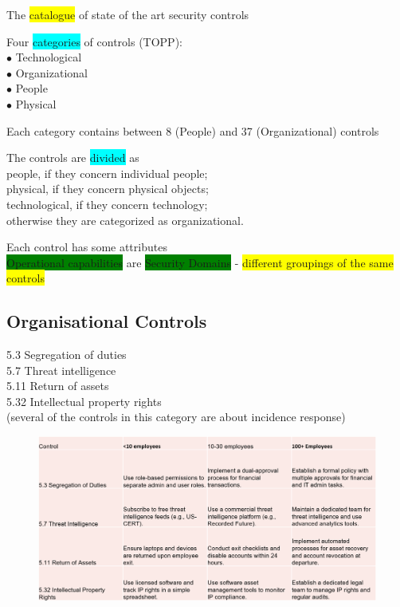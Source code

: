 \documentclass[tikz,border=10pt]{project_plan}
\newcommand{\bulletPoint}{\hspace{-3.1pt}$\bullet$ \hspace{5pt}}
\begin{document}
The \colorbox{yellow}{catalogue} of state of the art security controls

\newpage

Four \colorbox{cyan}{categories} of controls (TOPP):\\
\bulletPoint Technological\\
\bulletPoint Organizational \\
\bulletPoint People \\
\bulletPoint Physical

Each category contains between 8 (People) and 37 (Organizational) controls

The controls are \colorbox{cyan}{divided} as\\
people, if they concern individual people;\\
physical, if they concern physical objects;\\
technological, if they concern technology;\\
otherwise they are categorized as organizational.

Each control has some attributes\\
\colorbox{green}{Operational capabilities} are \colorbox{green}{Security Domains} - \colorbox{yellow}{different groupings of the same controls}

\subsection{Organisational Controls}

5.3 Segregation of duties \\
5.7 Threat intelligence\\
5.11 Return of assets \\
5.32 Intellectual property rights\\
(several of the controls in this category are about incidence response)

\begin{figure}[H]
  \centering
  \includegraphics[width=\linewidth]{organizational controls.png}
\end{figure}
\end{document}
